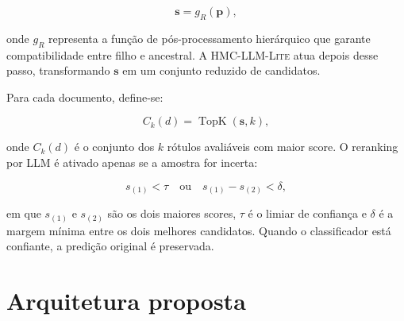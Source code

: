 \documentclass[11pt,a4paper]{article}
\newcommand{\method}{\textsc{HMC-LLM-Lite}}
\begin{document}
\begin{equation}
  \mathbf{s} = g_R(\mathbf{p}),
\end{equation}

\noindent onde $g_R$ representa a função de pós-processamento hierárquico que
garante compatibilidade entre filho e ancestral. A \method{} atua depois desse
passo, transformando $\mathbf{s}$ em um conjunto reduzido de candidatos.

Para cada documento, define-se:

\begin{equation}
  C_k(d)=\operatorname{TopK}(\mathbf{s}, k),
\end{equation}

\noindent onde $C_k(d)$ é o conjunto dos $k$ rótulos avaliáveis com maior score.
O reranking por LLM é ativado apenas se a amostra for incerta:

\begin{equation}
  s_{(1)} < \tau \quad \text{ou} \quad s_{(1)} - s_{(2)} < \delta,
\end{equation}

\noindent em que $s_{(1)}$ e $s_{(2)}$ são os dois maiores scores, $\tau$ é o
limiar de confiança e $\delta$ é a margem mínima entre os dois melhores
candidatos. Quando o classificador está confiante, a predição original é
preservada.

\section{Arquitetura proposta}
\end{document}
